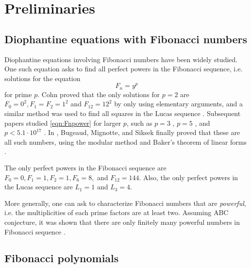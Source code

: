 \section{Preliminaries}
\label{sec:prelim}


\subsection{Diophantine equations with Fibonacci numbers}
\label{subsec:prelim_diophantine}

Diophantine equations involving Fibonacci numbers have been widely studied.
One such equation asks to find all perfect powers in the Fibonacci sequence, i.e. solutions for the equation
\begin{equation}
\label{eqn:Fnpower}    
F_n = y^p
\end{equation}
for prime \(p\).
Cohn \cite{cohn1964square} proved that the only solutions for \(p = 2\) are \(F_0 = 0^2, F_1 = F_2 = 1^2\) and \(F_{12} = 12^2\) by only using  elementary arguments, and a similar method was used to find all squares in the Lucas sequence \cite{cohn1965lucas}.
Subsequent papers studied \eqref{eqn:Fnpower} for larger \(p\), such as \(p = 3\) \cite{london1969fibonacci,petho1983full}, \(p = 5\) \cite{petho1981perfect}, and \(p < 5.1 \cdot 10^{17}\) \cite{petho2001diophantine}.
In \cite{bugeaud2006classical}, Bugeaud, Mignotte, and Siksek finally proved that these are all such numbers, using the modular method \cite{wiles1995modular,taylor1995ring} and Baker's theorem of linear forms \cite{shorey1986exponential}.
\begin{theorem}
    The only perfect powers in the Fibonacci sequence are \(F_0 = 0, F_1 = 1, F_2 = 1, F_6 = 8,\) and \(F_{12} = 144\).
    Also, the only perfect powers in the Lucas sequence are \(L_1 = 1\) and \(L_3 = 4\).
\end{theorem}


More generally, one can ask to characterize Fibonacci numbers that are \emph{powerful}, i.e. the multiplicities of each prime factors are at least two.
Assuming ABC conjecture, it was shown that there are only finitely many powerful numbers in Fibonacci sequence \cite{ribenboim1999abc,yabuta2007abc}.


\subsection{Fibonacci polynomials}
\label{subsec:prelim_fibonaccipoly}


